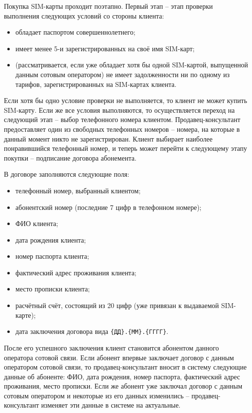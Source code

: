 Покупка SIM-карты проходит поэтапно. Первый этап -- этап проверки выполнения следующих условий со стороны клиента:
\begin{itemize}
    \item обладает паспортом совершеннолетнего;
    \item имеет менее 5-и зарегистрированных на своё имя SIM-карт;
    \item (рассматривается, если уже обладает хотя бы одной SIM-картой, выпущенной данным сотовым оператором) не имеет задолженности ни по одному из тарифов, зарегистрированных на SIM-картах клиента.
\end{itemize}

Если хотя бы одно условие проверки не выполняется, то клиент не может купить SIM-карту. Если же все условия выполняются, то осуществляется переход на следующий этап -- выбор телефонного номера клиентом. Продавец-консультант предоставляет один из свободных телефонных номеров -- номера, на которые в данный момент никто не зарегистрирован. Клиент выбирает наиболее понравившийся телефонный номер, и теперь может перейти к следующему этапу покупки -- подписание договора абонемента.

В договоре заполняются следующие поля:
\begin{itemize}
    \item телефонный номер, выбранный клиентом;
    \item абонентский номер (последние 7 цифр в телефонном номере);
    \item ФИО клиента;
    \item дата рождения клиента;
    \item номер паспорта клиента;
    \item фактический адрес проживания клиента;
    \item место прописки клиента;
    \item расчётный счёт, состоящий из 20 цифр (уже привязан к выдаваемой SIM-карте);
    \item дата заключения договора вида \texttt{\{ДД\}.\{ММ\}.\{ГГГГ\}}.
\end{itemize}

После его успешного заключения клиент становится абонентом данного оператора сотовой связи. Если абонент впервые заключает договор с данным оператором сотовой связи, то продавец-консультант вносит в систему следующие данные об абоненте: ФИО, дата рождения, номер паспорта, фактический адрес проживания, место прописки. Если же абонент уже заключал договор с данным сотовым оператором и некоторые из его данных изменились -- продавец-консультант изменяет эти данные в системе на актуальные.

